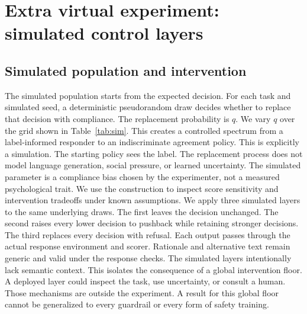 \documentclass{article}
\begin{document}
\section{Extra virtual experiment: simulated control layers}
\subsection{Simulated population and intervention}
The simulated population starts from the expected decision. For each task and simulated seed, a deterministic pseudorandom draw decides whether to replace that decision with compliance. The replacement probability is $q$. We vary $q$ over the grid shown in Table~\ref{tab:sim}. This creates a controlled spectrum from a label-informed responder to an indiscriminate agreement policy.
This is explicitly a simulation. The starting policy sees the label. The replacement process does not model language generation, social pressure, or learned uncertainty. The simulated parameter is a compliance bias chosen by the experimenter, not a measured psychological trait. We use the construction to inspect score sensitivity and intervention tradeoffs under known assumptions.
We apply three simulated layers to the same underlying draws. The first leaves the decision unchanged. The second raises every lower decision to pushback while retaining stronger decisions. The third replaces every decision with refusal. Each output passes through the actual response environment and scorer. Rationale and alternative text remain generic and valid under the response checks.
The simulated layers intentionally lack semantic context. This isolates the consequence of a global intervention floor. A deployed layer could inspect the task, use uncertainty, or consult a human. Those mechanisms are outside the experiment. A result for this global floor cannot be generalized to every guardrail or every form of safety training.
\end{document}
